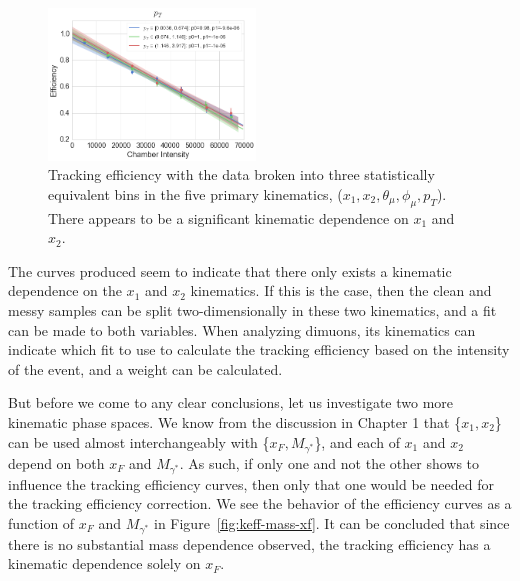 \begin{figure}
\includegraphics[width=0.49\textwidth]{figures/analysis/pt-keff-int.png}
\caption{Tracking efficiency with the data broken into three statistically equivalent bins in the five primary kinematics, ($x_1, x_2, \theta_\mu, \phi_\mu, p_T$). There appears to be a significant kinematic dependence on $x_1$ and $x_2$.}
\label{fig:keff-all-kin}
\end{figure}
The curves produced seem to indicate that there only exists a kinematic dependence on the $x_1$ and $x_2$ kinematics. If this is the case, then the clean and messy samples can be split two-dimensionally in these two kinematics, and a fit can be made to both variables. When analyzing dimuons, its kinematics can indicate which fit to use to calculate the tracking efficiency based on the intensity of the event, and a weight can be calculated.

But before we come to any clear conclusions, let us investigate two more kinematic phase spaces. We know from the discussion in Chapter 1 that \{$x_1, x_2$\} can be used almost interchangeably with \{$x_F, M_{\gamma^*}$\}, and each of $x_1$ and $x_2$ depend on both $x_F$ and $M_{\gamma^*}$. As such, if only one and not the other shows to influence the tracking efficiency curves, then only that one would be needed for the tracking efficiency correction. We see the behavior of the efficiency curves as a function of $x_F$ and $M_{\gamma^*}$ in Figure~\ref{fig:keff-mass-xf}. It can be concluded that since there is no substantial mass dependence observed, the tracking efficiency has a kinematic dependence solely on $x_F$.

